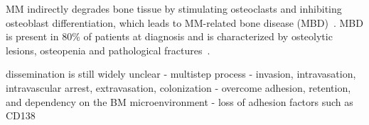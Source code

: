 MM indirectly degrades bone tissue by stimulating osteoclasts and inhibiting
osteoblast differentiation, which leads to MM-related bone disease
(MBD)~\cite{glaveyProteomicCharacterizationHuman2017}. MBD is present in 80\% of
patients at diagnosis and is characterized by osteolytic lesions, osteopenia and
pathological fractures~\cite{terposPathogenesisBoneDisease2018}.


dissemination is still widely unclear
- multistep process
- invasion, intravasation, intravascular arrest, extravasation,
colonization
- overcome adhesion, retention, and dependency on the BM
microenvironment
- loss of adhesion factors such as CD138

